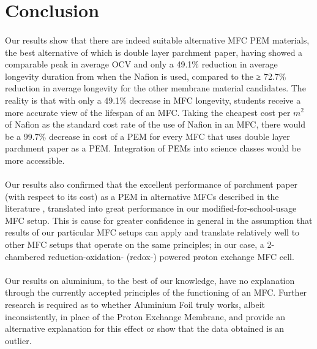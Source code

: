 \documentclass[12pt, twocolumn, a4paper]{article}
\begin{document}
\section{Conclusion}
\paragraph{}Our results show that there are indeed suitable alternative MFC PEM materials, the best alternative of which is double layer parchment paper, having showed a comparable peak in average OCV and only a 49.1\% reduction in average longevity duration from when the Nafion\texttrademark{} is used, compared to the ≥ 72.7\% reduction in average longevity for the other membrane material candidates. The reality is that with only a 49.1\% decrease in MFC longevity, students receive a more accurate view of the lifespan of an MFC. Taking the cheapest cost per $m^2$ of Nafion\texttrademark{} as the standard cost rate of the use of Nafion\texttrademark{} in an MFC, there would be a 99.7\% decrease in cost of a PEM for every MFC that uses double layer parchment paper as a PEM. Integration of PEMs into science classes would be more accessible.

\paragraph{}Our results also confirmed that the excellent performance of parchment paper (with respect to its cost) as a PEM in alternative MFCs described in the literature \cite{C4CP04804K, C5AN00492F, Lee2016-xq}, translated into great performance in our modified-for-school-usage MFC setup. This is cause for greater confidence in general in the assumption that results of our particular MFC setups can apply and translate relatively well to other MFC setups that operate on the same principles; in our case, a 2-chambered reduction-oxidation- (redox-) powered proton exchange MFC cell.

\paragraph{}Our results on aluminium, to the best of our knowledge, have no explanation through the currently accepted principles of the functioning of an MFC. Further research is required as to whether Aluminium Foil truly works, albeit inconsistently, in place of the Proton Exchange Membrane, and provide an alternative explanation for this effect or show that the data obtained is an outlier.
\end{document}
